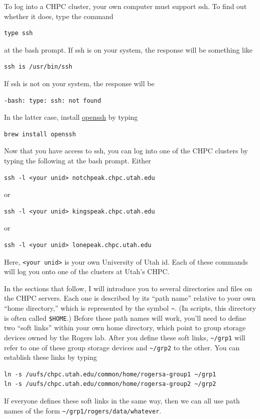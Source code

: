 \documentclass[11pt]{article}
\begin{document}
To log into a CHPC cluster, your own computer must support ssh. To
find out whether it does, type the command
\begin{verbatim}
type ssh
\end{verbatim}
at the bash prompt. If ssh is on your system, the response will be
something like
\begin{verbatim}
ssh is /usr/bin/ssh
\end{verbatim}
If ssh is not on your system, the response will be
\begin{verbatim}
-bash: type: ssh: not found
\end{verbatim}
In the latter case, install \href{https://www.openssh.com}{openssh} by
typing
\begin{verbatim}
brew install openssh
\end{verbatim}

Now that you have access to ssh, you can log into one of the CHPC
clusters by typing the following at the bash prompt. Either
\begin{verbatim}
ssh -l <your unid> notchpeak.chpc.utah.edu
\end{verbatim}
or
\begin{verbatim}
ssh -l <your unid> kingspeak.chpc.utah.edu
\end{verbatim}
or
\begin{verbatim}
ssh -l <your unid> lonepeak.chpc.utah.edu
\end{verbatim}
Here, \verb|<your unid>| is your own University of Utah id. Each of
these commands will log you onto one of the clusters at Utah's CHPC.

In the sections that follow, I will introduce you to several
directories and files on the CHPC servers. Each one is described by
its ``path name'' relative to your own ``home directory,'' which is
represented by the symbol \verb|~|. (In scripts, this directory is
often called \verb|$HOME|.) Before these path names will work, you'll
need to define two ``soft links'' within your own home directory,
which point to group storage devices owned by the Rogers lab. After
you define these soft links, \verb|~/grp1| will refer to one of these
group storage devices and \verb|~/grp2| to the other. You can
establish these links by typing
\begin{verbatim}
ln -s /uufs/chpc.utah.edu/common/home/rogersa-group1 ~/grp1
ln -s /uufs/chpc.utah.edu/common/home/rogersa-group2 ~/grp2
\end{verbatim}
If everyone defines these soft links in the same way, then we can all
use path names of the form \verb|~/grp1/rogers/data/whatever|.
\end{document}
